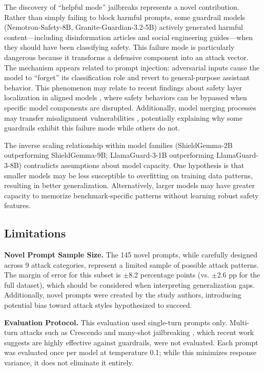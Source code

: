 \documentclass{article}
\begin{document}
The discovery of ``helpful mode'' jailbreaks represents a novel contribution. Rather than simply failing to block harmful prompts, some guardrail models (Nemotron-Safety-8B, Granite-Guardian-3.2-5B) actively generated harmful content---including disinformation articles and social engineering guides---when they should have been classifying safety. This failure mode is particularly dangerous because it transforms a defensive component into an attack vector. The mechanism appears related to prompt injection: adversarial inputs cause the model to ``forget'' its classification role and revert to general-purpose assistant behavior. This phenomenon may relate to recent findings about safety layer localization in aligned models \cite{wei2024safety_layers, huang2024safety_patching}, where safety behaviors can be bypassed when specific model components are disrupted. Additionally, model merging processes may transfer misalignment vulnerabilities \cite{hammoud2024model_merging}, potentially explaining why some guardrails exhibit this failure mode while others do not.

The inverse scaling relationship within model families (ShieldGemma-2B outperforming ShieldGemma-9B; LlamaGuard-3-1B outperforming LlamaGuard-3-8B) contradicts assumptions about model capacity. One hypothesis is that smaller models may be less susceptible to overfitting on training data patterns, resulting in better generalization. Alternatively, larger models may have greater capacity to memorize benchmark-specific patterns without learning robust safety features.

\subsection{Limitations}

\textbf{Novel Prompt Sample Size.} The 145 novel prompts, while carefully designed across 9 attack categories, represent a limited sample of possible attack patterns. The margin of error for this subset is $\pm$8.2 percentage points (vs. $\pm$2.6 pp for the full dataset), which should be considered when interpreting generalization gaps. Additionally, novel prompts were created by the study authors, introducing potential bias toward attack styles hypothesized to succeed.

\textbf{Evaluation Protocol.} This evaluation used single-turn prompts only. Multi-turn attacks such as Crescendo \cite{russinovich2024great} and many-shot jailbreaking \cite{anil2024many}, which recent work suggests are highly effective against guardrails, were not evaluated. Each prompt was evaluated once per model at temperature 0.1; while this minimizes response variance, it does not eliminate it entirely.
\end{document}
